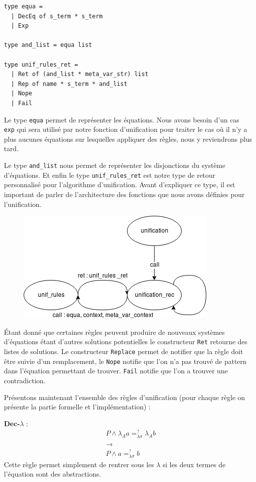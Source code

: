 \begin{lstlisting}
type equa = 
  | DecEq of s_term * s_term
  | Exp

type and_list = equa list

type unif_rules_ret =
  | Ret of (and_list * meta_var_str) list
  | Rep of name * s_term * and_list
  | Nope
  | Fail
\end{lstlisting}

Le type \verb|equa| permet de représenter les équations. Nous avons besoin d'un cas \verb|exp| qui sera utilisé par notre fonction d'unification pour traiter le cas où il n'y a plus aucunes équations sur lesquelles appliquer des règles, nous y reviendrons plus tard.

Le type \verb|and_list| nous permet de représenter les 
disjonctions du système d'équations.
Et enfin le type \verb|unif_rules_ret| est notre type de retour personnalisé pour l'algorithme d'unification.
Avant d'expliquer ce type, il est important de parler de l'architecture des fonctions que nous avons définies pour l'unification.
\begin{figure}[H]
    \centering
    \includegraphics[scale=0.6]{images/unif_diagram.png}
\end{figure}

Étant donné que certaines règles peuvent produire de nouveaux systèmes d'équations étant d'autres solutions potentielles
le constructeur \verb|Ret| retourne des listes de solutions.
Le constructeur \verb|Replace| permet de notifier que la règle doit être suivie d'un remplacement, le \verb|Nope| notifie que l'on n'a pas trouvé de pattern dans l'équation permettant de trouver. \verb|Fail| notifie que l'on a trouver une contradiction.


Présentons maintenant l'ensemble des règles d'unification (pour chaque règle on présente la partie formelle et l'implémentation) :\label{unificationrules}

\textbf{Dec-$\lambda$} :
\begin{align*}
    &P \wedge \lambda_A a =_{\lambda \sigma}^{?} \lambda_A b \\
    &\xrightarrow{} \\
    &P \wedge a =_{\lambda \sigma}^{?} b
\end{align*}
Cette règle permet simplement de rentrer sous les $\lambda$ si les deux termes de l'équation sont des abstractions.

